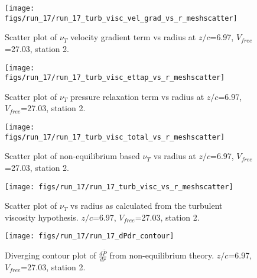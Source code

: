 \begin{figure}[H]
\centering
\texttt{[image: figs/run\_17/run\_17\_turb\_visc\_vel\_grad\_vs\_r\_meshscatter]}
\caption{Scatter plot of $\nu_T$ velocity gradient term vs radius at $z/c$=6.97, $V_{free}$=27.03, station 2.}
\end{figure}


\begin{figure}[H]
\centering
\texttt{[image: figs/run\_17/run\_17\_turb\_visc\_ettap\_vs\_r\_meshscatter]}
\caption{Scatter plot of $\nu_T$ pressure relaxation term vs radius at $z/c$=6.97, $V_{free}$=27.03, station 2.}
\end{figure}


\begin{figure}[H]
\centering
\texttt{[image: figs/run\_17/run\_17\_turb\_visc\_total\_vs\_r\_meshscatter]}
\caption{Scatter plot of non-equilibrium based $\nu_T$ vs radius at $z/c$=6.97, $V_{free}$=27.03, station 2.}
\end{figure}


\begin{figure}[H]
\centering
\texttt{[image: figs/run\_17/run\_17\_turb\_visc\_vs\_r\_meshscatter]}
\caption{Scatter plot of $\nu_T$ vs radius as calculated from the turbulent viscosity hypothesis. $z/c$=6.97, $V_{free}$=27.03, station 2.}
\end{figure}


\begin{figure}[H]
\centering
\texttt{[image: figs/run\_17/run\_17\_dPdr\_contour]}
\caption{Diverging contour plot of $\frac{d\bar{P}}{dr}$ from non-equilibrium theory. $z/c$=6.97, $V_{free}$=27.03, station 2.}
\end{figure}


